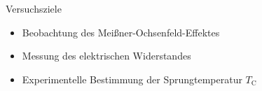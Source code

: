 \begin{frame}{Versuchsziele}
\begin{itemize}
  \item Beobachtung des Meißner-Ochsenfeld-Effektes
  \item Messung des elektrischen Widerstandes
  \item Experimentelle Bestimmung der Sprungtemperatur $T_{\mathup{C}}$
\end{itemize}
\end{frame}

